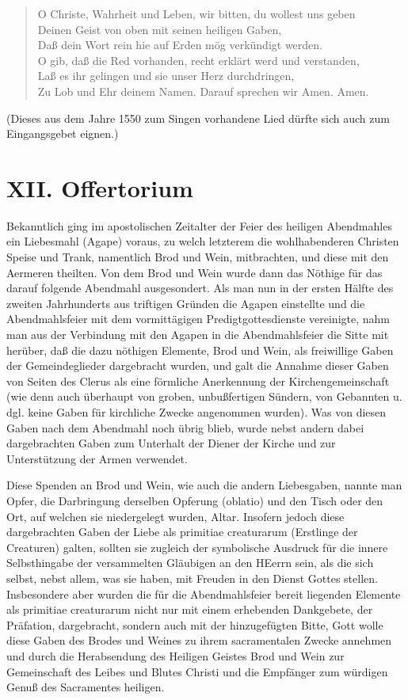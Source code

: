 \begin{verse}
O Christe, Wahrheit und Leben, wir bitten, du wollest uns geben\\
Deinen Geist von oben mit seinen heiligen Gaben,\\
Daß dein Wort rein hie auf Erden mög verkündigt werden.\\
O gib, daß die Red vorhanden, recht erklärt werd und verstanden,\\
Laß es ihr gelingen und sie unser Herz durchdringen,\\
Zu Lob und Ehr deinem Namen. Darauf sprechen wir Amen. Amen.
\end{verse}

(Dieses aus dem Jahre 1550 zum Singen vorhandene Lied dürfte sich auch zum Eingangsgebet eignen.)

\chapter{XII. Offertorium}


Bekanntlich ging im apostolischen Zeitalter der Feier des heiligen Abendmahles ein Liebesmahl (Agape) voraus, zu welch letzterem die wohlhabenderen Christen Speise und Trank, namentlich Brod und Wein, mitbrachten, und diese mit den Aermeren theilten. Von dem Brod und Wein wurde dann das Nöthige für das darauf folgende Abendmahl ausgesondert. Als man nun in der ersten Hälfte des zweiten Jahrhunderts aus triftigen Gründen die Agapen einstellte und die Abendmahlsfeier mit dem vormittägigen Predigtgottesdienste vereinigte, nahm man aus der Verbindung mit den Agapen in die Abendmahlsfeier die Sitte mit herüber, daß die dazu nöthigen Elemente, Brod und Wein, als freiwillige Gaben der Gemeindeglieder dargebracht wurden, und galt die Annahme dieser Gaben von Seiten des Clerus als eine förmliche Anerkennung der Kirchengemeinschaft (wie denn auch überhaupt von groben, unbußfertigen Sündern, von Gebannten u. dgl. keine Gaben für kirchliche Zwecke angenommen wurden). Was von diesen Gaben nach dem Abendmahl noch übrig blieb, wurde nebst andern dabei dargebrachten Gaben zum Unterhalt der Diener der Kirche und zur Unterstützung der Armen verwendet.

Diese Spenden an Brod und Wein, wie auch die andern Liebesgaben, nannte man Opfer, die Darbringung derselben Opferung (oblatio) und den Tisch oder den Ort, auf welchen sie niedergelegt wurden, Altar. Insofern jedoch diese dargebrachten Gaben der Liebe als primitiae creaturarum (Erstlinge der Creaturen) galten, sollten sie zugleich der symbolische Ausdruck für die innere Selbsthingabe der versammelten Gläubigen an den HEerrn sein, als die sich selbst, nebst allem, was sie haben, mit Freuden in den Dienst Gottes stellen. Insbesondere aber wurden die für die Abendmahlsfeier bereit liegenden Elemente als primitiae creaturarum nicht nur mit einem erhebenden Dankgebete, der Präfation, dargebracht, sondern auch mit der hinzugefügten Bitte, Gott wolle diese Gaben des Brodes und Weines zu ihrem sacramentalen Zwecke annehmen und durch die Herabsendung des Heiligen Geistes Brod und Wein zur Gemeinschaft des Leibes und Blutes Christi und die Empfänger zum würdigen Genuß des Sacramentes heiligen.

